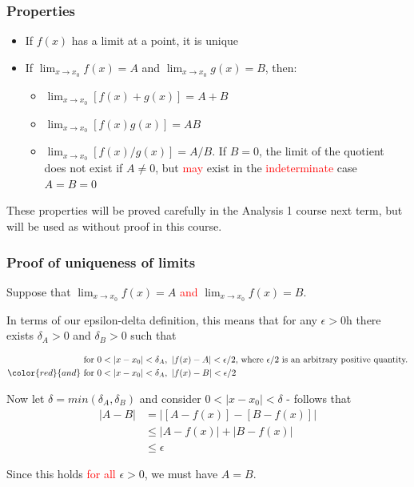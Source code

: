 \hypertarget{properties}{%
\subsubsection{Properties}\label{properties}}

\begin{itemize}
\tightlist
\item
  If \(f(x)\) has a limit at a point, it is unique
\item
  If \(\lim_{x \to x_0} f(x) = A\) and \(\lim_{x \to x_0} g(x) = B\), then:

  \begin{itemize}
  \tightlist
  \item
    \(\lim_{x \to x_0} [f(x) + g(x)] = A + B\)\\
  \item
    \(\lim_{x \to x_0} [f(x)g(x)] = AB\)\\
  \item
    \(\lim_{x \to x_0} [f(x) / g(x)] = A / B\). If \(B = 0\), the limit of the quotient does not exist if \(A \neq 0\), but \textcolor{red}{may} exist in the \textcolor{red}{indeterminate} case \(A = B = 0\)
  \end{itemize}
\end{itemize}

These properties will be proved carefully in the Analysis 1 course next term, but will be used as without proof in this course.

\hypertarget{proof-of-uniqueness-of-limits}{%
\subsubsection{Proof of uniqueness of limits}\label{proof-of-uniqueness-of-limits}}

Suppose that \(\lim_{x \to x_0} f(x) = A\) \textcolor{red}{and} \(\lim_{x \to x_0} f(x) = B\).

In terms of our epsilon-delta definition, this means that for any \(\epsilon > 0\)h there exists \(\delta_A > 0\) and \(\delta_B > 0\) such that

\begin{align*}
  &\text{for }0 < |x -x_0| < \delta_A,\ |f(x) - A| < \epsilon / 2 \text{, where } \epsilon / 2 \text{ is an arbitrary positive quantity.} \\
  \color{red}{and} \ &\text{for } 0 < |x -x_0| < \delta_A,\ |f(x) - B| < \epsilon / 2
\end{align*}

Now let \(\delta = min(\delta_A, \delta_B)\) and consider \(0 < |x -x_0| < \delta\) - follows that
\begin{align*}
  |A - B| &= |[A - f(x)] - [B - f(x)]| \\
  &\leq |A - f(x)| + |B - f(x)| \\
  &\leq \epsilon
\end{align*}

Since this holds \textcolor{red}{for all} \(\epsilon > 0\), we must have \(A = B\).